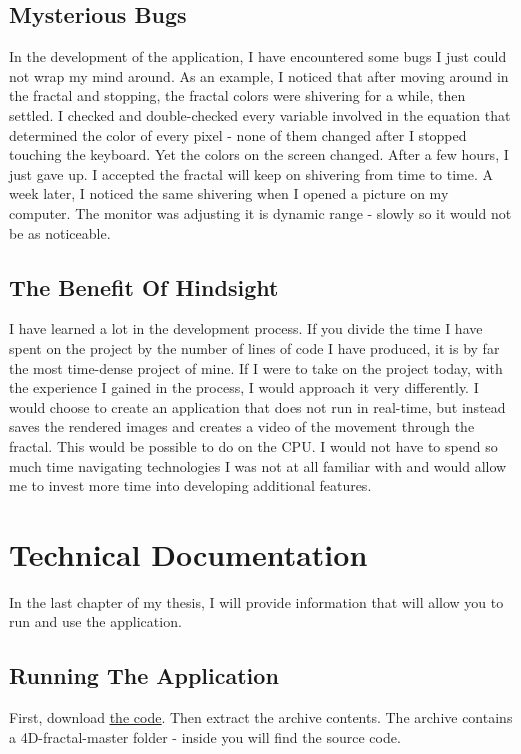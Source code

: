 \documentclass[11pt,a4paper,twoside,openright]{report}
\begin{document}
\section{Mysterious Bugs}
In the development of the application, I have encountered some bugs I just could not wrap my mind around. As an example, I noticed that after moving around in the fractal and stopping, the fractal colors were shivering for a while, then settled. I checked and double-checked every variable involved in the equation that determined the color of every pixel - none of them changed after I stopped touching the keyboard. Yet the colors on the screen changed. After a few hours, I just gave up. I accepted the fractal will keep on shivering from time to time. A week later, I noticed the same shivering when I opened a picture on my computer. The monitor was adjusting it is dynamic range - slowly so it would not be as noticeable. 
\section{The Benefit Of Hindsight}
I have learned a lot in the development process. If you divide the time I have spent on the project by the number of lines of code I have produced, it is by far the most time-dense project of mine. If I were to take on the project today, with the experience I gained in the process, I would approach it very differently. I would choose to create an application that does not run in real-time, but instead saves the rendered images and creates a video of the movement through the fractal. This would be possible to do on the CPU. I would not have to spend so much time navigating technologies I was not at all familiar with and would allow me to invest more time into developing additional features.

\chapter{Technical Documentation}
In the last chapter of my thesis, I will provide information that will allow you to run and use the application.

\section{Running The Application}
First, download \underline{\href{https://github.com/MikulasVanousek/4D-fractal/archive/refs/heads/master.zip}{the code}}. Then extract the archive contents. The archive contains a 4D-fractal-master folder - inside you will find the source code.
\end{document}
